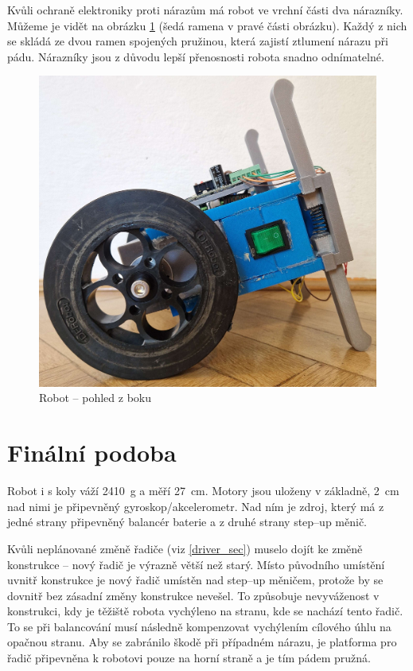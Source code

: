 Kvůli ochraně elektroniky proti nárazům má robot ve vrchní části dva nárazníky. Můžeme je vidět na obrázku \ref{robot-side} (šedá ramena v pravé části obrázku). Každý z nich se skládá ze dvou ramen spojených pružinou, která zajistí ztlumení nárazu při pádu. Nárazníky jsou z důvodu lepší přenosnosti robota snadno odnímatelné. 

\begin{figure}[H]
    \centering
    \includegraphics[width=0.9\linewidth]{obrazky-figures/side.jpg}
    \caption {Robot -- pohled z boku}
    \label{robot-side}
\end{figure}

\section{Finální podoba}
Robot i s koly váží 2410~g a měří 27~cm. Motory jsou uloženy v základně, 2~cm nad nimi je připevněný gyroskop/akcelerometr. Nad ním je zdroj, který má z jedné strany připevněný balancér baterie a z druhé strany step--up měnič.

Kvůli neplánované změně řadiče (viz \ref{driver_sec}) muselo dojít ke změně konstrukce -- nový řadič je výrazně větší než starý. Místo původního umístění uvnitř konstrukce je nový řadič umístěn nad step--up měničem, protože by se dovnitř bez zásadní změny konstrukce nevešel. To způsobuje nevyváženost v konstrukci, kdy je těžiště robota vychýleno na stranu, kde se nachází tento řadič. To se při balancování musí následně kompenzovat vychýlením cílového úhlu na opačnou stranu. Aby se zabránilo škodě při případném nárazu, je platforma pro řadič připevněna k robotovi pouze na horní straně a je tím pádem pružná.

